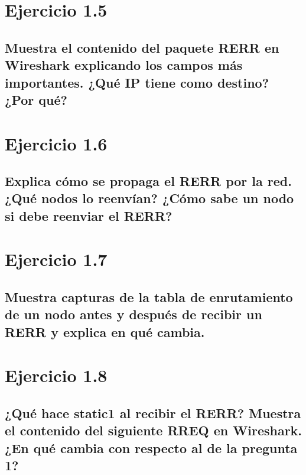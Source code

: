 \vspace{1.25cm}
\section{Ejercicio 1.5}

\subsection{Muestra el contenido del paquete RERR en Wireshark explicando los campos más importantes. ¿Qué IP
tiene como destino? ¿Por qué?}

\section{Ejercicio 1.6}

\subsection{Explica cómo se propaga el RERR por la red. ¿Qué nodos lo reenvían? ¿Cómo sabe un nodo si debe reenviar
el RERR?}

\section{Ejercicio 1.7} 

\subsection{Muestra capturas de la tabla de enrutamiento de un nodo antes y después de recibir un RERR y explica en
qué cambia.}

\section{Ejercicio 1.8}

\subsection{¿Qué hace static1 al recibir el RERR? Muestra el contenido del siguiente RREQ en Wireshark. ¿En qué cambia
con respecto al de la pregunta 1?}